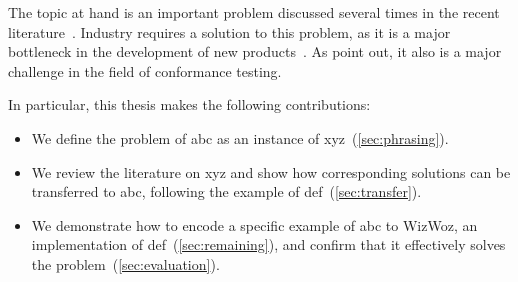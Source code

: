 The topic at hand is an important problem discussed several times in the recent literature~\cite{oakland23-xfl,spmag23-mlmalware,cryptosec11}.
Industry requires a solution to this problem, as it is a major bottleneck in the development of new products~\cite{phdthesis-kinder}.
As \citet{conformance-testing-arxiv} point out, it also is a major challenge in the field of conformance testing.

\lipsum[2-4]

In particular, this thesis makes the following contributions:
\begin{itemize}
    \item We define the problem of abc as an instance of xyz~(\autoref{sec:phrasing}).
    \item We review the literature on xyz and show how corresponding solutions can be transferred to abc, following the example of def~(\autoref{sec:transfer}).
    \item We demonstrate how to encode a specific example of abc to WizWoz, an implementation of def~(\autoref{sec:remaining}), and confirm that it effectively solves the problem~(\autoref{sec:evaluation}).
\end{itemize}
